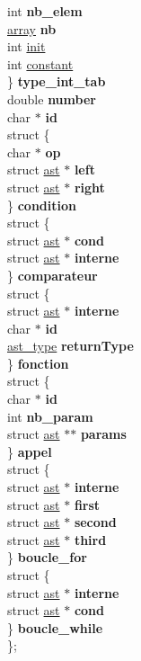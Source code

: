 \begin{DoxyCompactItemize}
\begin{tabbing}
\>\>int {\bfseries nb\_elem}\\
\>\>\hyperlink{structarray}{array} {\bfseries nb}\\
\>\>int \hyperlink{structast_a795ea50921b36311ffd5e7baa2ef1f7e}{init}\\
\>\>int \hyperlink{structast_ac347bb44c6dc857729453831c5714f84}{constant}\\
\>\} {\bfseries type\_int\_tab}\\
\>double {\bfseries number}\\
\>char $\ast$ {\bfseries id}\\
\>struct \{\\
\>\>char $\ast$ {\bfseries op}\\
\>\>struct \hyperlink{structast}{ast} $\ast$ {\bfseries left}\\
\>\>struct \hyperlink{structast}{ast} $\ast$ {\bfseries right}\\
\>\} {\bfseries condition}\\
\>struct \{\\
\>\>struct \hyperlink{structast}{ast} $\ast$ {\bfseries cond}\\
\>\>struct \hyperlink{structast}{ast} $\ast$ {\bfseries interne}\\
\>\} {\bfseries comparateur}\\
\>struct \{\\
\>\>struct \hyperlink{structast}{ast} $\ast$ {\bfseries interne}\\
\>\>char $\ast$ {\bfseries id}\\
\>\>\hyperlink{ast_8h_a77091c187ac9a89404fac2e8226daef3}{ast\_type} {\bfseries returnType}\\
\>\} {\bfseries fonction}\\
\>struct \{\\
\>\>char $\ast$ {\bfseries id}\\
\>\>int {\bfseries nb\_param}\\
\>\>struct \hyperlink{structast}{ast} $\ast$$\ast$ {\bfseries params}\\
\>\} {\bfseries appel}\\
\>struct \{\\
\>\>struct \hyperlink{structast}{ast} $\ast$ {\bfseries interne}\\
\>\>struct \hyperlink{structast}{ast} $\ast$ {\bfseries first}\\
\>\>struct \hyperlink{structast}{ast} $\ast$ {\bfseries second}\\
\>\>struct \hyperlink{structast}{ast} $\ast$ {\bfseries third}\\
\>\} {\bfseries boucle\_for}\\
\>struct \{\\
\>\>struct \hyperlink{structast}{ast} $\ast$ {\bfseries interne}\\
\>\>struct \hyperlink{structast}{ast} $\ast$ {\bfseries cond}\\
\>\} {\bfseries boucle\_while}\\
\}; \\


\end{tabbing}
\end{DoxyCompactItemize}
